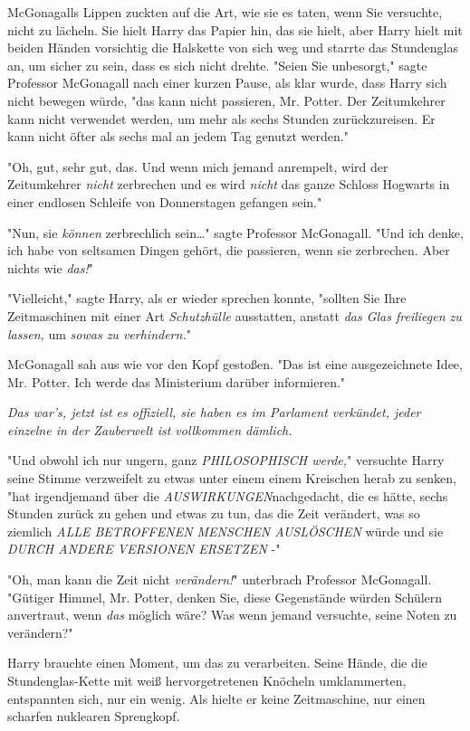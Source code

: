 {McGonagalls Lippen zuckten auf die Art, wie sie es taten, wenn Sie versuchte, nicht zu lächeln. Sie hielt Harry das Papier hin, das sie hielt, aber Harry hielt mit beiden Händen vorsichtig die Halskette von sich weg und starrte das Stundenglas an, um sicher zu sein, dass es sich nicht drehte. "Seien Sie unbesorgt," sagte Professor McGonagall nach einer kurzen Pause, als klar wurde, dass Harry sich nicht bewegen würde, "das kann nicht passieren, Mr. Potter. Der Zeitumkehrer kann nicht verwendet werden, um mehr als sechs Stunden zurückzureisen. Er kann nicht öfter als sechs mal an jedem Tag genutzt werden."

"Oh, gut, sehr gut, das. Und wenn mich jemand anrempelt, wird der Zeitumkehrer \emph{nicht} zerbrechen und es wird \emph{nicht} das ganze Schloss Hogwarts in einer endlosen Schleife von Donnerstagen gefangen sein."

"Nun, sie \emph{können} zerbrechlich sein…" sagte Professor McGonagall. "Und ich denke, ich habe von seltsamen Dingen gehört, die passieren, wenn sie zerbrechen. Aber nichts wie \emph{das!}"

"Vielleicht," sagte Harry, als er wieder sprechen konnte, "sollten Sie Ihre Zeitmaschinen mit einer Art \emph{Schutzhülle} ausstatten, anstatt \emph{das Glas freiliegen zu lassen,} um \emph{sowas zu verhindern.}"

McGonagall sah aus wie vor den Kopf gestoßen. "Das ist eine ausgezeichnete Idee, Mr. Potter. Ich werde das Ministerium darüber informieren."

\emph{Das war's, jetzt ist es offiziell, sie haben es im Parlament verkündet, jeder einzelne in der Zauberwelt ist vollkommen dämlich.}

"Und obwohl ich nur ungern, ganz \emph{PHILOSOPHISCH werde,}" versuchte Harry seine Stimme verzweifelt zu etwas unter einem einem Kreischen herab zu senken, "hat irgendjemand über die \emph{AUSWIRKUNGEN}nachgedacht, die es hätte, sechs Stunden zurück zu gehen und etwas zu tun, das die Zeit verändert, was so ziemlich \emph{ALLE BETROFFENEN MENSCHEN AUSLÖSCHEN} würde und sie \emph{DURCH ANDERE VERSIONEN ERSETZEN} -"

"Oh, man kann die Zeit nicht \emph{verändern!}" unterbrach Professor McGonagall. "Gütiger Himmel, Mr. Potter, denken Sie, diese Gegenstände würden Schülern anvertraut, wenn \emph{das} möglich wäre? Was wenn jemand versuchte, seine Noten zu verändern?"

Harry brauchte einen Moment, um das zu verarbeiten. Seine Hände, die die Stundenglas-Kette mit weiß hervorgetretenen Knöcheln umklammerten, entspannten sich, nur ein wenig. Als hielte er keine Zeitmaschine, nur einen scharfen nuklearen Sprengkopf.

}
